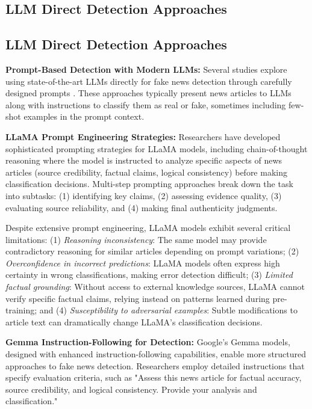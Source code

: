 \subsection{LLM Direct Detection Approaches}

\subsection{LLM Direct Detection Approaches}

\textbf{Prompt-Based Detection with Modern LLMs:} Several studies explore using state-of-the-art LLMs directly for fake news detection through carefully designed prompts \cite{chen2023chatgpt, bang2023multitask}. These approaches typically present news articles to LLMs along with instructions to classify them as real or fake, sometimes including few-shot examples in the prompt context.

\textbf{LLaMA Prompt Engineering Strategies:} Researchers have developed sophisticated prompting strategies for LLaMA models, including chain-of-thought reasoning where the model is instructed to analyze specific aspects of news articles (source credibility, factual claims, logical consistency) before making classification decisions. Multi-step prompting approaches break down the task into subtasks: (1) identifying key claims, (2) assessing evidence quality, (3) evaluating source reliability, and (4) making final authenticity judgments.

Despite extensive prompt engineering, LLaMA models exhibit several critical limitations: (1) \emph{Reasoning inconsistency}: The same model may provide contradictory reasoning for similar articles depending on prompt variations; (2) \emph{Overconfidence in incorrect predictions}: LLaMA models often express high certainty in wrong classifications, making error detection difficult; (3) \emph{Limited factual grounding}: Without access to external knowledge sources, LLaMA cannot verify specific factual claims, relying instead on patterns learned during pre-training; and (4) \emph{Susceptibility to adversarial examples}: Subtle modifications to article text can dramatically change LLaMA's classification decisions.

\textbf{Gemma Instruction-Following for Detection:} Google's Gemma models, designed with enhanced instruction-following capabilities, enable more structured approaches to fake news detection. Researchers employ detailed instructions that specify evaluation criteria, such as "Assess this news article for factual accuracy, source credibility, and logical consistency. Provide your analysis and classification."

